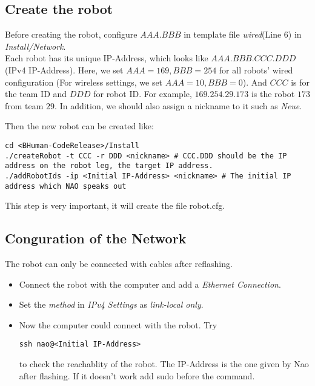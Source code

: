 \documentclass[a4paper]{article}
\begin{document}
\subsection{Create the robot}
Before creating the robot, configure  $AAA.BBB$ in template file \emph{wired}(Line 6) in \emph{Install/Network}.\\
Each robot has its unique IP-Address, which looks like $AAA.BBB.CCC.DDD$ (IPv4 IP-Address). Here, we set $AAA = 169, BBB=254$ for all robots' wired configuration (For wireless settings, we set $AAA=10, BBB=0$). And $CCC$ is for the team ID and $DDD$ for robot ID. For example, $169.254.29.173$ is the robot $173$ from team $29$.  In addition, we should also assign a nickname to it such as \emph{Neue}.

Then the new robot can be created like:
\begin{lstlisting}
cd <BHuman-CodeRelease>/Install
./createRobot -t CCC -r DDD <nickname> # CCC.DDD should be the IP address on the robot leg, the target IP address.
./addRobotIds -ip <Initial IP-Address> <nickname> # The initial IP address which NAO speaks out
\end{lstlisting}
This step is very important, it will create the file robot.cfg.
\subsection{Conguration of the Network}
The robot can only be connected with cables after reflashing. 
\begin{itemize}
\item Connect the robot with the computer and add a \emph{Ethernet Connection}. 
\item Set the \emph{method} in \emph{IPv4 Settings} as \emph{link-local only}. 
\item Now the computer could connect with the robot. Try 
\begin{lstlisting}
ssh nao@<Initial IP-Address>
\end{lstlisting}
to check the reachablity of the robot. The IP-Address is the one given by Nao after flashing.
If it doesn't work add sudo before the command.
\end{itemize}
\end{document}
